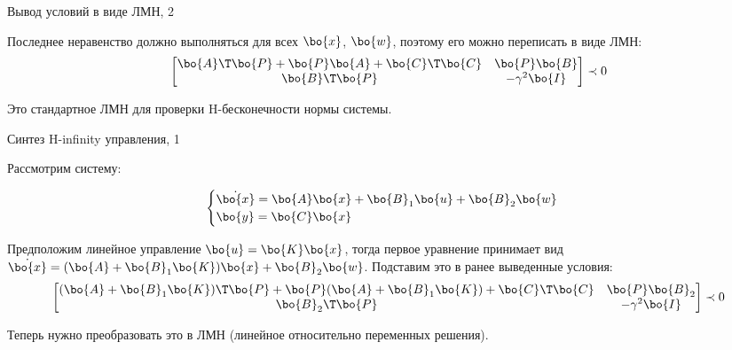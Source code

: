 \documentclass{beamer}
\begin{document}
	
	
	\begin{frame}{Вывод условий в виде ЛМН, 2}
		\begin{flushleft}
			
			Последнее неравенство должно выполняться для всех $\bo{x}$, $\bo{w}$, поэтому его можно переписать в виде ЛМН:
			\begin{align}
				\begin{bmatrix}
					\bo{A}\T\bo{P}+\bo{P}\bo{A}+\bo{C}\T\bo{C} & \bo{P}\bo{B} \\
					\bo{B}\T\bo{P}  & -\gamma^2 \bo{I}
				\end{bmatrix}
				\prec 0
			\end{align}
			
			Это стандартное ЛМН для проверки H-бесконечности нормы системы.
			
		\end{flushleft}
	\end{frame}
	
	
	\begin{frame}{Синтез H-infinity управления, 1}
		\begin{flushleft}
			
			Рассмотрим систему:
			
			\begin{equation}
				\begin{cases}
					\dot{\bo{x}} = \bo{A}\bo{x}+\bo{B}_1\bo{u}+\bo{B}_2\bo{w}
					\\
					\bo{y} = \bo{C}\bo{x}
				\end{cases}
			\end{equation}
			
			Предположим линейное управление $\bo{u} = \bo{K}\bo{x}$, тогда первое уравнение принимает вид $\dot{\bo{x}} = (\bo{A}+\bo{B}_1\bo{K})\bo{x}+\bo{B}_2\bo{w}$. Подставим это в ранее выведенные условия:
			\begin{align}
				\begin{bmatrix}
					(\bo{A}+\bo{B}_1\bo{K})\T\bo{P}+\bo{P}(\bo{A}+\bo{B}_1\bo{K})+\bo{C}\T\bo{C} & \bo{P}\bo{B}_2 \\
					\bo{B}_2\T\bo{P}  & -\gamma^2 \bo{I}
				\end{bmatrix}
				\prec 0
			\end{align}
			
			Теперь нужно преобразовать это в ЛМН (линейное относительно переменных решения).
			
		\end{flushleft}
	\end{frame}
	
\end{document}
